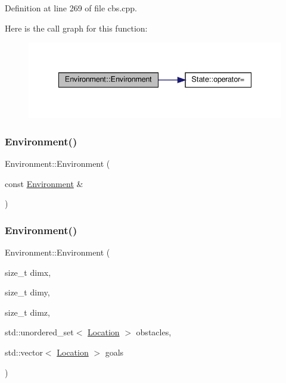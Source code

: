Definition at line 269 of file cbs.\+cpp.

Here is the call graph for this function\+:
\nopagebreak
\begin{figure}[H]
\begin{center}
\leavevmode
\includegraphics[width=335pt]{class_environment_a12b8baed8e6090b3eb528a27b1fecd0a_cgraph}
\end{center}
\end{figure}
\mbox{\label{class_environment_abdb9fe9212fd5d47b5664df3e67c975f}} 
\subsubsection{\texorpdfstring{Environment()}{Environment()}\hspace{0.1cm}{\footnotesize\ttfamily [4/6]}}
{\footnotesize\ttfamily Environment\+::\+Environment (\begin{DoxyParamCaption}\item[{const \hyperlink{class_environment}{Environment} \&}]{ }\end{DoxyParamCaption})\hspace{0.3cm}{\ttfamily [delete]}}

\mbox{\label{class_environment_a12b8baed8e6090b3eb528a27b1fecd0a}} 
\subsubsection{\texorpdfstring{Environment()}{Environment()}\hspace{0.1cm}{\footnotesize\ttfamily [5/6]}}
{\footnotesize\ttfamily Environment\+::\+Environment (\begin{DoxyParamCaption}\item[{size\+\_\+t}]{dimx,  }\item[{size\+\_\+t}]{dimy,  }\item[{size\+\_\+t}]{dimz,  }\item[{std\+::unordered\+\_\+set$<$ \hyperlink{struct_location}{Location} $>$}]{obstacles,  }\item[{std\+::vector$<$ \hyperlink{struct_location}{Location} $>$}]{goals }\end{DoxyParamCaption})\hspace{0.3cm}{\ttfamily [inline]}}



